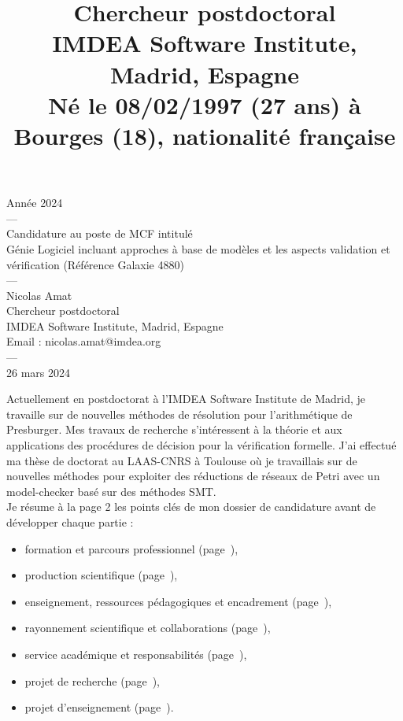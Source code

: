 \documentclass[11pt,a4paper]{moderncv}
\title{\normalsize  Chercheur postdoctoral\\
IMDEA Software Institute, Madrid, Espagne\\
Né le 08/02/1997 (27 ans) à Bourges (18), nationalité française\\
}
\begin{document}
\thispagestyle{empty}

\begin{center}
{\small Année 2024\\---\\
\huge Candidature au poste de MCF intitulé \\\og Génie Logiciel incluant approches à base de modèles et les aspects validation et vérification\fg\medbreak
\Large(Référence Galaxie 4880)\\
\small
---\\
\Large Nicolas Amat \\
\vspace{1em}
\small Chercheur postdoctoral\\
IMDEA Software Institute, Madrid, Espagne\\
    Email : nicolas.amat@imdea.org\\
---\\
26 mars 2024}
\end{center}

\newpage

\setcounter{page}{1}
\newpage

\makecvtitle
{}

Actuellement en postdoctorat à l'IMDEA Software Institute de Madrid, je
travaille sur de nouvelles méthodes de résolution pour l'arithmétique de
Presburger. Mes travaux de recherche s'intéressent à la théorie et aux
applications des procédures de décision pour la vérification formelle. J'ai
effectué ma thèse de doctorat au LAAS-CNRS à Toulouse où je travaillais sur de
nouvelles méthodes pour exploiter des réductions de réseaux de Petri avec un
model-checker basé sur des méthodes SMT.\\

Je résume à la page 2 les points clés de mon dossier de candidature avant de
développer chaque partie :
\begin{itemize}
    \item formation et parcours professionnel (page~\pageref{sec:formation}),
    \item production scientifique (page~\pageref{sec:recherche}), 
    \item enseignement, ressources pédagogiques et encadrement (page~\pageref{sec:enseignements}),
    \item rayonnement scientifique et collaborations (page~\pageref{sec:rayonnement}),
    \item service académique et responsabilités (page~\pageref{sec:resp}),
    \item projet de recherche (page~\pageref{sec:projet_recherche}),
    \item projet d'enseignement (page~\pageref{sec:projet_enseignement}).\\
\end{itemize}
\end{document}
